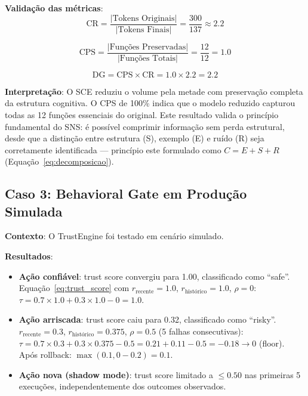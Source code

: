 \textbf{Validação das métricas}:
\begin{equation}
\text{CR} = \frac{|\text{Tokens Originais}|}{|\text{Tokens Finais}|} = \frac{300}{137} \approx 2.2
\label{eq:cr_validacao}
\end{equation}

\begin{equation}
\text{CPS} = \frac{|\text{Funções Preservadas}|}{|\text{Funções Totais}|} = \frac{12}{12} = 1.0
\label{eq:cps_validacao}
\end{equation}

\begin{equation}
\text{DG} = \text{CPS} \times \text{CR} = 1.0 \times 2.2 = 2.2
\label{eq:dg_validacao}
\end{equation}

\textbf{Interpretação}: O SCE reduziu o volume pela metade com preservação completa da estrutura cognitiva. O CPS de 100\% indica que o modelo reduzido capturou todas as 12 funções essenciais do original. Este resultado valida o princípio fundamental do SNS: é possível comprimir informação sem perda estrutural, desde que a distinção entre estrutura (S), exemplo (E) e ruído (R) seja corretamente identificada — princípio este formulado como $C = E + S + R$ (Equação~\ref{eq:decomposicao}).

\subsection{Caso 3: Behavioral Gate em Produção Simulada}

\textbf{Contexto}: O TrustEngine foi testado em cenário simulado.

\textbf{Resultados}:
\begin{itemize}
    \item \textbf{Ação confiável}: trust score convergiu para 1.00, classificado como ``safe''. Equação~\ref{eq:trust_score} com $r_{\text{recente}}=1.0$, $r_{\text{histórico}}=1.0$, $\rho=0$: $\tau = 0.7 \times 1.0 + 0.3 \times 1.0 - 0 = 1.0$.
    \item \textbf{Ação arriscada}: trust score caiu para 0.32, classificado como ``risky''. $r_{\text{recente}}=0.3$, $r_{\text{histórico}}=0.375$, $\rho=0.5$ (5 falhas consecutivas): $\tau = 0.7 \times 0.3 + 0.3 \times 0.375 - 0.5 = 0.21 + 0.11 - 0.5 = -0.18 \rightarrow 0$ (floor). Após rollback: $\max(0.1, 0 - 0.2) = 0.1$.
    \item \textbf{Ação nova (shadow mode)}: trust score limitado a $\leq 0.50$ nas primeiras 5 execuções, independentemente dos outcomes observados.
\end{itemize}

